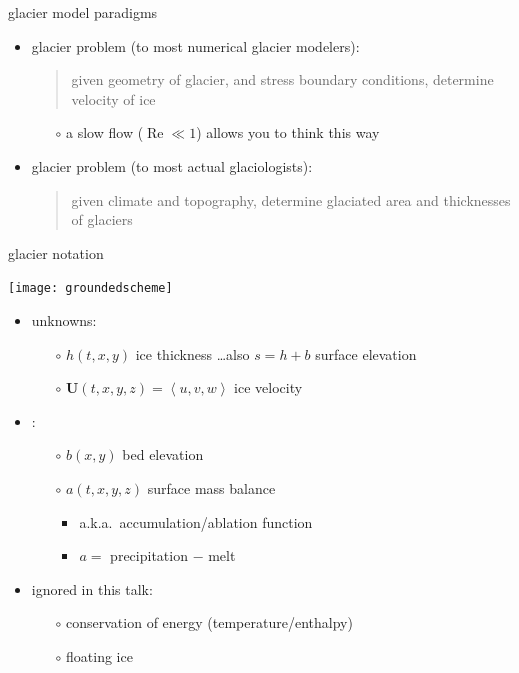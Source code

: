 \documentclass[xcolor={dvipsnames}]{beamer}
\newcommand\bU{\mathbf{U}}
\begin{document}
\begin{frame}{glacier model paradigms}

\begin{itemize}
\item<1> glacier problem \alert<1>{(to most numerical glacier modelers)}:
   \begin{quote}
   given geometry of glacier, and stress boundary conditions, determine velocity of ice
   \end{quote}
\vspace{-4mm}
  \begin{itemize}
  \item[$\circ$] a slow flow ($\operatorname{Re} \ll 1$) allows you to think this way
  \end{itemize}

\bigskip
\item<2> glacier problem \alert<2>{(to most actual glaciologists)}:
   \begin{quote}
   given climate and topography, determine glaciated area and thicknesses of glaciers
   \end{quote}
\end{itemize}
\end{frame}


\begin{frame}{glacier notation}

\begin{center}
\texttt{[image: groundedscheme]}
\end{center}

\begin{itemize}
\item unknowns:
  \begin{itemize}
  \item[$\circ$]  $h(t,x,y)$ ice thickness \hfill \dots also $s=h+b$ surface elevation
  \item[$\circ$]  $\bU(t,x,y,z) = \left<u,v,w\right>$ ice velocity
  \end{itemize}
\item {}:
  \begin{itemize}
  \item[$\circ$]  $b(x,y)$ bed elevation 
  \item[$\circ$]  $a(t,x,y,z)$ surface mass balance  
    \begin{itemize}
    \item a.k.a.~accumulation/ablation function
    \item $a=$ precipitation $-$ melt
    \end{itemize}
  \end{itemize}
\item ignored in this talk:
  \begin{itemize}
  \item[$\circ$]  conservation of energy (temperature/enthalpy)
  \item[$\circ$]  floating ice
  \end{itemize}
\end{itemize}
\end{frame}
\end{document}
